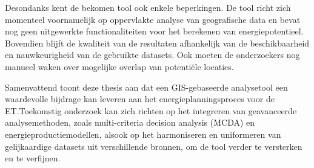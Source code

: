 Desondanks kent de bekomen tool ook enkele beperkingen. De tool richt zich momenteel voornamelijk op oppervlakte analyse van geografische data en bevat nog geen uitgewerkte functionaliteiten voor het berekenen van energiepotentieel. Bovendien blijft de kwaliteit van de resultaten afhankelijk van de beschikbaarheid en nauwkeurigheid van de gebruikte datasets. Ook moeten de onderzoekers nog manueel waken over mogelijke overlap van potentiële locaties.\medskip

Samenvattend toont deze thesis aan dat een GIS-gebaseerde analysetool een waardevolle bijdrage kan leveren aan het energieplanningsproces voor de ET.\@ Toekomstig onderzoek kan zich richten op het integreren van geavanceerde analysemethoden, zoals multi-criteria decision analysis (MCDA) en energieproductiemodellen, alsook op het harmoniseren en uniformeren van gelijkaardige datasets uit verschillende bronnen, om de tool verder te versterken en te verfijnen.